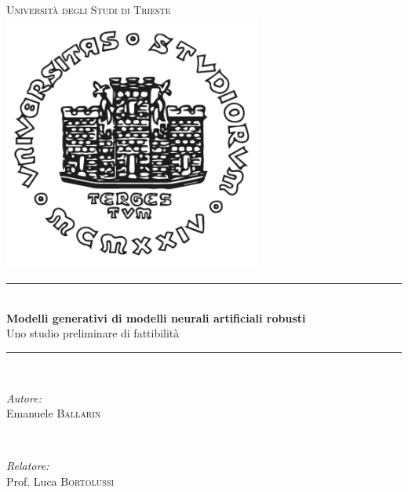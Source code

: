 \documentclass[a4paper, twoside]{article}
\begin{document}
\begin{titlepage}
\newcommand{\HRule}{\rule{\linewidth}{0.5mm}} %
\center %


\vspace{-16mm}
\vspace*{16mm}
\textsc{\LARGE{Università degli Studi di Trieste}}\\[1.5cm] %


\includegraphics[width=0.30\linewidth]{logouniv.png} %


\HRule \\[0.4cm]
{ \huge \bfseries Modelli generativi di modelli neurali artificiali robusti}\\[0.4cm] %
{ \LARGE Uno studio preliminare di fattibilità}\\[0.4cm]
\HRule \\[1.5cm]


\begin{minipage}{0.4\textwidth}
\begin{flushleft}
\Large \emph{{Autore:}}\\
{Emanuele} \textsc{{Ballarin}} %
\end{flushleft}
\end{minipage}
~
\begin{minipage}{0.4\textwidth}
\begin{flushleft}
\Large \emph{{Relatore:}} \\
{Prof. Luca}  \textsc{{Bortolussi}} \\ %


\end{flushleft}
\end{minipage}
\end{titlepage}
\end{document}

